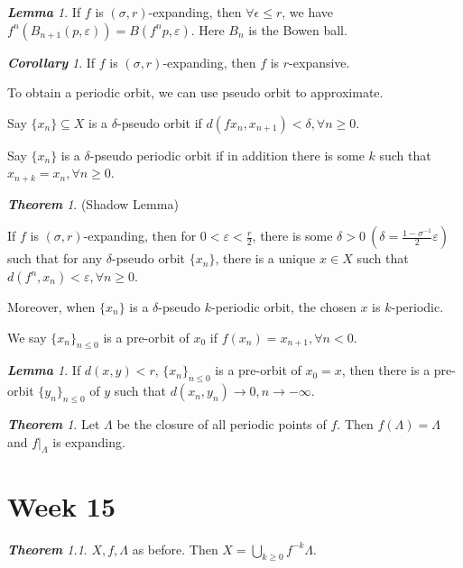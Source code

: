 \documentclass[10pt, a4paper, oneside]{report}
\numberwithin{equation}{chapter}
\theoremstyle{remark}
\newtheorem{theorem}[definition]{\bf{Theorem}}
\newtheorem{lemma}[definition]{\bf{Lemma}}
\newtheorem{corollary}[definition]{\bf{Corollary}}
\theoremstyle{remark}
\begin{document}
\begin{lemma}
    If $f$ is $(\sigma,r)$-expanding, then $\forall \epsilon\leqslant r$, we have $f^n(B_{n+1}(p,\varepsilon))=B(f^np,\varepsilon)$. Here $B_n$ is the Bowen ball.
\end{lemma}

\begin{corollary}
    If $f$ is $(\sigma,r)$-expanding, then $f$ is $r$-expansive.
\end{corollary}

To obtain a periodic orbit, we can use pseudo orbit to approximate.

Say $\{x_n\}\subseteq X$ is a $\delta$-pseudo orbit if $d(fx_n,x_{n+1})<\delta,\forall n\geqslant 0$.

Say $\{x_n\}$ is a $\delta$-pseudo periodic orbit if in addition there is some $k$ such that $x_{n+k}=x_n,\forall n\geqslant 0$.

\begin{theorem}
    (Shadow Lemma)

    If $f$ is $(\sigma,r)$-expanding, then for $0<\varepsilon<\frac{r}{2}$, there is some $\delta>0~(\delta=\frac{1-\sigma^{-1}}{2}\varepsilon)$ such that for any $\delta$-pseudo orbit $\{x_n\}$, there is a unique $x\in X$
    such that $d(f^n,x_n)<\varepsilon,\forall n\geqslant 0$.

    Moreover, when $\{x_n\}$ is a $\delta$-pseudo $k$-periodic orbit, the chosen $x$ is $k$-periodic.
\end{theorem}

We say $\{x_n\}_{n\leqslant 0}$ is a pre-orbit of $x_0$ if $f(x_n)=x_{n+1},\forall n<0.$

\begin{lemma}
    If $d(x,y)<r$, $\{x_n\}_{n\leqslant 0}$ is a pre-orbit of $x_0=x$, then there is a pre-orbit $\{y_n\}_{n\leqslant 0}$ of $y$ such that $d(x_n,y_n)\to 0,n\to-\infty.$
\end{lemma}

\begin{theorem}
    Let $\Lambda$ be the closure of all periodic points of $f$. Then $f(\Lambda)=\Lambda$ and $f|_\Lambda$ is expanding.
\end{theorem}

\chapter{Week 15}

\begin{theorem}
    $X,f,\Lambda$ as before. Then $X=\bigcup\limits_{k\geqslant 0}f^{-k}\Lambda.$
\end{theorem}
\end{document}

